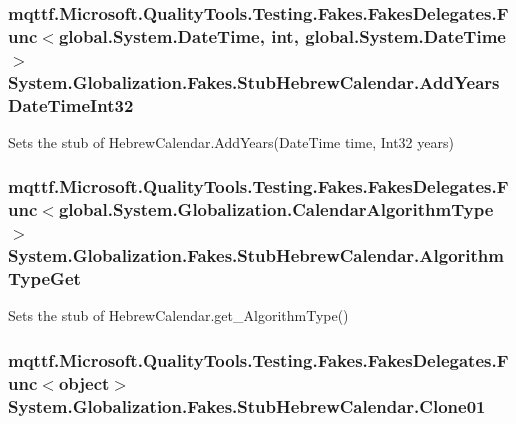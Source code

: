 \hypertarget{class_system_1_1_globalization_1_1_fakes_1_1_stub_hebrew_calendar_aa0aa6a62252de379055127666243f633}{
\subsubsection[{Add\-Years\-Date\-Time\-Int32}]{\setlength{\rightskip}{0pt plus 5cm}mqttf.\-Microsoft.\-Quality\-Tools.\-Testing.\-Fakes.\-Fakes\-Delegates.\-Func$<$global.\-System.\-Date\-Time, int, global.\-System.\-Date\-Time$>$ System.\-Globalization.\-Fakes.\-Stub\-Hebrew\-Calendar.\-Add\-Years\-Date\-Time\-Int32}}\label{class_system_1_1_globalization_1_1_fakes_1_1_stub_hebrew_calendar_aa0aa6a62252de379055127666243f633}


Sets the stub of Hebrew\-Calendar.\-Add\-Years(\-Date\-Time time, Int32 years)

\hypertarget{class_system_1_1_globalization_1_1_fakes_1_1_stub_hebrew_calendar_a146df2272f970e6b3e50fc4a61928b2c}{
\subsubsection[{Algorithm\-Type\-Get}]{\setlength{\rightskip}{0pt plus 5cm}mqttf.\-Microsoft.\-Quality\-Tools.\-Testing.\-Fakes.\-Fakes\-Delegates.\-Func$<$global.\-System.\-Globalization.\-Calendar\-Algorithm\-Type$>$ System.\-Globalization.\-Fakes.\-Stub\-Hebrew\-Calendar.\-Algorithm\-Type\-Get}}\label{class_system_1_1_globalization_1_1_fakes_1_1_stub_hebrew_calendar_a146df2272f970e6b3e50fc4a61928b2c}


Sets the stub of Hebrew\-Calendar.\-get\-\_\-\-Algorithm\-Type()

\hypertarget{class_system_1_1_globalization_1_1_fakes_1_1_stub_hebrew_calendar_a2213a6ac93c33d22b19db3875a9c01e6}{
\subsubsection[{Clone01}]{\setlength{\rightskip}{0pt plus 5cm}mqttf.\-Microsoft.\-Quality\-Tools.\-Testing.\-Fakes.\-Fakes\-Delegates.\-Func$<$object$>$ System.\-Globalization.\-Fakes.\-Stub\-Hebrew\-Calendar.\-Clone01}}\label{class_system_1_1_globalization_1_1_fakes_1_1_stub_hebrew_calendar_a2213a6ac93c33d22b19db3875a9c01e6}


